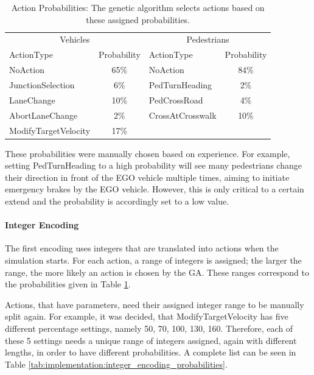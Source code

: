 \begin{table}[ht]
	\centering
	\begin{tabular}{lc|lc}
		\hline
		\multicolumn{2}{c|}{Vehicles} & \multicolumn{2}{c}{Pedestrians} \\
		ActionType & Probability & ActionType & Probability \\
		\hline
		NoAction & 65\% & NoAction & 84\% \\
		JunctionSelection & 6\% & PedTurnHeading & 2\% \\
		LaneChange & 10\% & PedCrossRoad & 4\% \\
		AbortLaneChange & 2\% & CrossAtCrosswalk & 10\% \\
		ModifyTargetVelocity & 17\% & & \\
		\hline
	\end{tabular}
	\caption{Action Probabilities: The genetic algorithm selects actions based on these assigned probabilities.}
	\label{tab:implementation:action_probabilities}
\end{table}

These probabilities were manually chosen based on experience. For example, setting PedTurnHeading to a high probability will see many pedestrians change their direction in front of the EGO vehicle multiple times, aiming to initiate emergency brakes by the EGO vehicle. However, this is only critical to a certain extend and the probability is accordingly set to a low value.

\paragraph{Integer Encoding}
The first encoding uses integers that are translated into actions when the simulation starts. For each action, a range of integers is assigned; the larger the range, the more likely an action is chosen by the GA. These ranges correspond to the probabilities given in Table \ref{tab:implementation:action_probabilities}.

Actions, that have parameters, need their assigned integer range to be manually split again. For example, it was decided, that ModifyTargetVelocity has five different percentage settings, namely 50, 70, 100, 130, 160. Therefore, each of these 5 settings needs a unique range of integers assigned, again with different lengths, in order to have different probabilities. A complete list can be seen in Table \ref{tab:implementation:integer_encoding_probabilities}.

